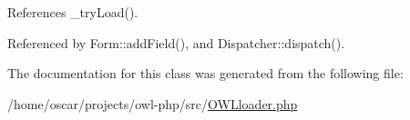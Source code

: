References \_\-tryLoad().



Referenced by Form::addField(), and Dispatcher::dispatch().



The documentation for this class was generated from the following file:\begin{DoxyCompactItemize}
\item 
/home/oscar/projects/owl-\/php/src/\hyperlink{OWLloader_8php}{OWLloader.php}\end{DoxyCompactItemize}
